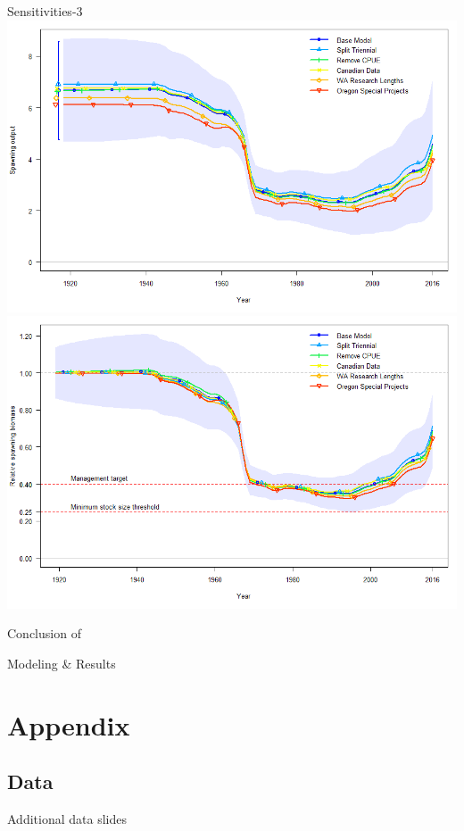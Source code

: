\documentclass[pdf]{beamer}\usepackage[]{graphicx}\usepackage[]{color}
\begin{document}
\begin{frame}{Sensitivities-3}
    \includegraphics[scale = 0.20]{figures/ssb_sens2.png}
    \includegraphics[scale = 0.20]{figures/depl_sens2.png}
\end{frame}


\begin{frame}
  \Huge{\centerline{Conclusion of}}
  \Huge{\centerline{Modeling \& Results}}
\end{frame}

\section*{Appendix}
\subsection*{Data}
\begin{frame}
  \Huge{\centerline{Additional data slides}}
\end{frame}
\end{document}
